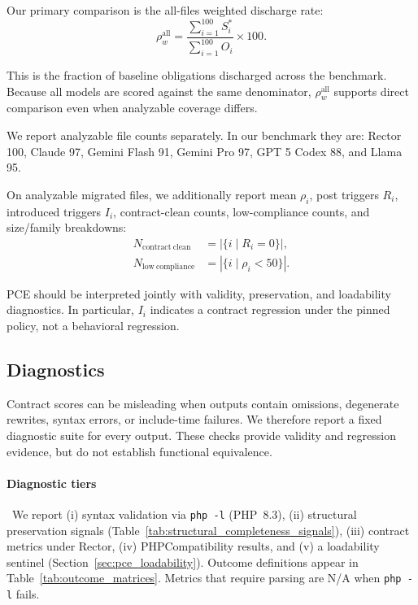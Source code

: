 Our primary comparison is the all-files weighted discharge rate:
\[
\rho_w^{\mathrm{all}} =
\frac{\sum_{i=1}^{100} S_i^*}{\sum_{i=1}^{100} O_i}\times 100.
\]

This is the fraction of baseline obligations discharged across the benchmark. Because all models are scored against the same denominator, $\rho_w^{\mathrm{all}}$ supports direct comparison even when analyzable coverage differs.

We report analyzable file counts separately. In our benchmark they are: Rector 100, Claude 97, Gemini Flash 91, Gemini Pro 97, GPT 5 Codex 88, and Llama 95.

On analyzable migrated files, we additionally report mean $\rho_i$, post triggers $R_i$, introduced triggers $I_i$, contract-clean counts, low-compliance counts, and size/family breakdowns:
\begin{align}
N_{\mathrm{contract\ clean}} &= |\{ i \mid R_i=0 \}|,\\
N_{\mathrm{low\ compliance}} &= |\{ i \mid \rho_i<50 \}|.
\end{align}

PCE should be interpreted jointly with validity, preservation, and loadability diagnostics. In particular, $I_i$ indicates a contract regression under the pinned policy, not a behavioral regression.

\subsection{Diagnostics}
\label{sec:pce_validity_diagnostics}

Contract scores can be misleading when outputs contain omissions, degenerate rewrites, syntax errors, or include-time failures. We therefore report a fixed diagnostic suite for every output. These checks provide validity and regression evidence, but do not establish functional equivalence.

\paragraph*{Diagnostic tiers}\
We report
(i) syntax validation via \texttt{php -l} (PHP~8.3),
(ii) structural preservation signals (Table~\ref{tab:structural_completeness_signals}),
(iii) contract metrics under Rector,
(iv) PHPCompatibility results, and
(v) a loadability sentinel (Section~\ref{sec:pce_loadability}).
Outcome definitions appear in Table~\ref{tab:outcome_matrices}. Metrics that require parsing are N/A when \texttt{php -l} fails.

